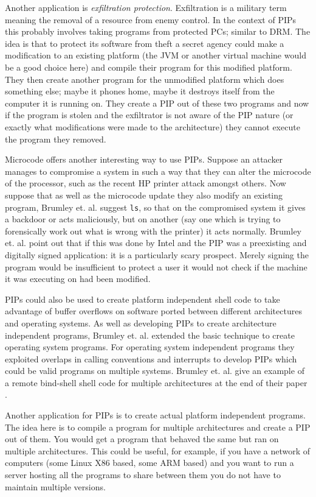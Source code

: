 \documentclass[10pt,]{book}
\begin{document}
Another application is \emph{exfiltration protection}. Exfiltration is a
military term meaning the removal of a resource from enemy control. In
the context of PIPs this probably involves taking programs from
protected PCs; similar to DRM. The idea is that to protect its software
from theft a secret agency could make a modification to an existing
platform (the JVM or another virtual machine would be a good choice
here) and compile their program for this modified platform. They then
create another program for the unmodified platform which does something
else; maybe it phones home, maybe it destroys itself from the computer
it is running on. They create a PIP out of these two programs and now if
the program is stolen and the exfiltrator is not aware of the PIP nature
(or exactly what modifications were made to the architecture) they
cannot execute the program they removed.

Microcode offers another interesting way to use PIPs. Suppose an
attacker manages to compromise a system in such a way that they can
alter the microcode of the processor, such as the recent HP printer
attack amongst others\autocite{Cui:vx}\autocite{Scythale:tk}. Now
suppose that as well as the microcode update they also modify an
existing program, Brumley et. al. suggest \lstinline!ls!, so that on the
compromised system it gives a backdoor or acts maliciously, but on
another (say one which is trying to forensically work out what is wrong
with the printer) it acts normally. Brumley et. al. point
out\autocite{Cha:2010uh} that if this was done by Intel and the PIP was
a preexisting and digitally signed application: it is a particularly
scary prospect. Merely signing the program would be insufficient to
protect a user it would not check if the machine it was executing on had
been modified.

PIPs could also be used to create platform independent shell code to
take advantage of buffer overflows on software ported between different
architectures and operating systems. As well as developing PIPs to
create architecture independent programs, Brumley et.
al.\autocite{Cha:2010uh} extended the basic technique to create
operating system programs. For operating system independent programs
they exploited overlaps in calling conventions and interrupts to develop
PIPs which could be valid programs on multiple systems. Brumley et. al.
give an example of a remote bind-shell shell code for multiple
architectures at the end of their paper \autocite{Cha:2010uh}.

Another application for PIPs is to create actual platform independent
programs. The idea here is to compile a program for multiple
architectures and create a PIP out of them. You would get a program that
behaved the same but ran on multiple architectures. This could be
useful, for example, if you have a network of computers (some Linux X86
based, some ARM based) and you want to run a server hosting all the
programs to share between them you do not have to maintain multiple
versions.
\end{document}
